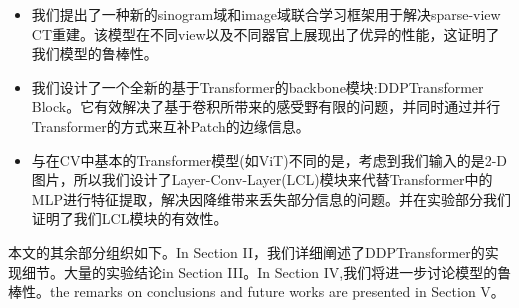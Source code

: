 \begin{itemize} 
		\item 我们提出了一种新的sinogram域和image域联合学习框架用于解决sparse-view CT重建。该模型在不同view以及不同器官上展现出了优异的性能，这证明了我们模型的鲁棒性。
		\item 我们设计了一个全新的基于Transformer的backbone模块:DDPTransformer Block。它有效解决了基于卷积所带来的感受野有限的问题，并同时通过并行Transformer的方式来互补Patch的边缘信息。
		\item 与在CV中基本的Transformer模型(如ViT)不同的是，考虑到我们输入的是2-D图片，所以我们设计了Layer-Conv-Layer(LCL)模块来代替Transformer中的MLP进行特征提取，解决因降维带来丢失部分信息的问题。并在实验部分我们证明了我们LCL模块的有效性。
\end{itemize}

本文的其余部分组织如下。In Section II，我们详细阐述了DDPTransformer的实现细节。大量的实验结论in Section III。In Section IV,我们将进一步讨论模型的鲁棒性。the remarks on conclusions and future works are presented in Section V。\par